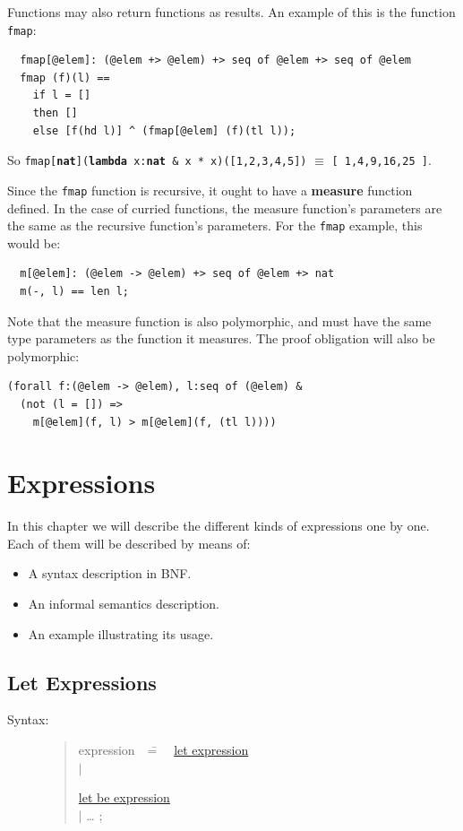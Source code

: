\documentclass{overturerepchap}
\newcommand{\Rule}[2]{
  \begin{quote}\begin{tabbing}
    #1\index{#1}\ \ \= = \ \ \= #2  ; %

  \end{tabbing}\end{quote}
  }
\newcommand{\Ruleref}[1]{
  \hyperlink{rule:#1}{#1}}
\newcommand{\dsep}{\\ \> $|$ \>}
\newcommand{\keyw}[1]{{\bf\ttfamily #1}}
\begin{document}
{\vspace{1ex}
Functions may also return functions as results. An example of this is
the function \texttt{fmap}:
\begin{lstlisting}
  fmap[@elem]: (@elem +> @elem) +> seq of @elem +> seq of @elem
  fmap (f)(l) ==
    if l = []
    then []
    else [f(hd l)] ^ (fmap[@elem] (f)(tl l));
\end{lstlisting}
So \texttt{fmap[\keyw{nat}](\keyw{lambda} x:\keyw{nat} \& x * x)([1,2,3,4,5])} $\equiv$
\texttt{[ 1,4,9,16,25 ]}.

\vspace{1ex}
\noindent Since the \texttt{fmap} function is recursive, it ought to have a \keyw{measure}
function defined. In the case of curried functions, the measure function's parameters
are the same as the recursive function's parameters. For
the \texttt{fmap} example, this would be:
\begin{lstlisting}
  m[@elem]: (@elem -> @elem) +> seq of @elem +> nat
  m(-, l) == len l;
\end{lstlisting}
Note that the measure function is also polymorphic, and must have the same type
parameters as the function it measures. The proof obligation will also be polymorphic:
\begin{lstlisting}
(forall f:(@elem -> @elem), l:seq of (@elem) &
  (not (l = []) =>
    m[@elem](f, l) > m[@elem](f, (tl l))))
\end{lstlisting}

\chapter{Expressions}\label{chap:expr}

In this chapter we will describe the different kinds of expressions
one by one. Each of them will be described by means of:
\begin{itemize}
\item A syntax description in BNF.
\item An informal semantics description.
\item An example illustrating its usage.
\end{itemize}

\section{Let Expressions}\label{let-exp}

\begin{description}
\item[Syntax:]
  \Rule{expression}{
    \Ruleref{let expression} \dsep
    \Ruleref{let be expression} \dsep
    \ldots
    }


\end{description}}
\end{document}
